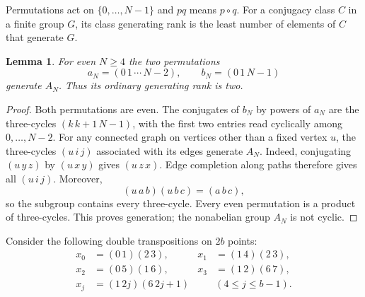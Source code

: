 \documentclass[11pt]{article}
\newtheorem{lemma}[theorem]{Lemma}
\begin{document}
Permutations act on $\{0,\ldots,N-1\}$ and $pq$ means $p\circ q$.
For a conjugacy class $C$ in a finite group $G$, its class generating rank
is the least number of elements of $C$ that generate $G$.

\begin{lemma}\label{lem:ordinary}
For even $N\ge4$ the two permutations
\[
 a_N=(0\,1\,\cdots\,N-2),\qquad b_N=(0\,1\,N-1)
\]
generate $A_N$. Thus its ordinary generating rank is two.
\end{lemma}
\begin{proof}
Both permutations are even. The conjugates of $b_N$ by powers of $a_N$
are the three-cycles $(k\,k+1\,N-1)$, with the first two entries read
cyclically among $0,\ldots,N-2$.
For any connected graph on vertices other than a fixed vertex $u$, the
three-cycles $(u\,i\,j)$ associated with its edges generate $A_N$.
Indeed, conjugating $(u\,y\,z)$ by $(u\,x\,y)$ gives $(u\,z\,x)$.
Edge completion along paths therefore gives all $(u\,i\,j)$. Moreover,
\[
 (u\,a\,b)(u\,b\,c)=(a\,b\,c),
\]
so the subgroup contains every three-cycle. Every even permutation is
a product of three-cycles. This proves generation; the nonabelian group
$A_N$ is not cyclic.
\end{proof}

Consider the following double transpositions on $2b$ points:
\begin{equation}\label{eq:generators}
\begin{aligned}
 x_0&=(0\,1)(2\,3),& x_1&=(1\,4)(2\,3),\\
 x_2&=(0\,5)(1\,6),& x_3&=(1\,2)(6\,7),\\
 x_j&=(1\,2j)(6\,2j+1)&& (4\le j\le b-1).
\end{aligned}
\end{equation}
\end{document}
